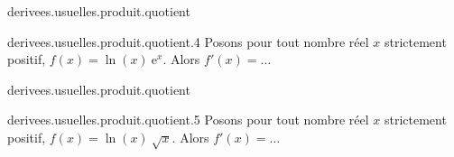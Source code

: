 \begin{qcm}{derivees.usuelles.produit.quotient}
    \begin{question}{derivees.usuelles.produit.quotient.4}
        Posons pour tout nombre réel \(x\) strictement positif, \( f(x)=\ln(x) \ {\mathrm{e}}^x \). Alors \( f'(x)=\ldots\)
         \begin{multicols}{2}         
	  \begin{reponses}
%   		 
          \end{reponses}
         \end{multicols}
    \end{question}
\end{qcm}

\begin{qcm}{derivees.usuelles.produit.quotient}
    \begin{question}{derivees.usuelles.produit.quotient.5}
        Posons pour tout nombre réel \(x\) strictement positif, \( f(x)=\ln(x) \ \sqrt{x} \). Alors \( f'(x)=\ldots\)
         \begin{multicols}{2}         
	  \begin{reponses}

		 \lastchoices
          \end{reponses}
         \end{multicols}
    \end{question}
\end{qcm}